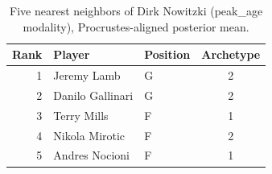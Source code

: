 \begin{table}[htbp]
  \centering\small
  \begin{tabular}{rllc}
    \toprule
    Rank & Player & Position & Archetype \\
    \midrule
    1 & Jeremy Lamb & G & 2 \\
    2 & Danilo Gallinari & G & 2 \\
    3 & Terry Mills & F & 1 \\
    4 & Nikola Mirotic & F & 2 \\
    5 & Andres Nocioni & F & 1 \\
    \bottomrule
  \end{tabular}
  \caption{Five nearest neighbors of Dirk Nowitzki (peak_age modality), Procrustes-aligned posterior mean.}
  \label{tab:Dirk_Nowitzki_neighbors_peak_age}
\end{table}

